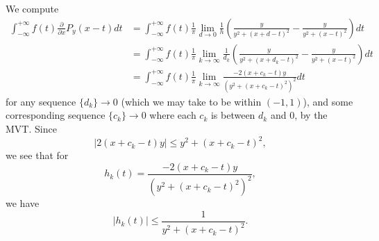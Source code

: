 \documentclass{article}
\newcommand\abs[1]{\left|#1\right|}
\begin{document}
We compute 
\begin{align*}
	\int_{-\infty}^{+\infty} f(t) \frac{\partial}{\partial x} P_{y}(x - t) dt &= \int_{-\infty}^{+\infty} f(t) \frac{1}{\pi} \lim_{d \rightarrow 0} \frac{1}{h} \left( \frac{y}{y^{2} + (x + d - t)^{2}} - \frac{y}{y^{2} + (x - t)^{2}} \right) dt \\
	&= \int_{-\infty}^{+\infty} f(t) \frac{1}{\pi} \lim_{k \rightarrow \infty} \frac{1}{d_{k}} \left( \frac{y}{y^{2} + (x + d_{k} - t)^{2}} - \frac{y}{y^{2} + (x - t)^{2}} \right) dt \\
	&= \int_{-\infty}^{+\infty} f(t) \frac{1}{\pi} \lim_{k \rightarrow \infty} \frac{-2(x + c_{k} - t)y}{(y^{2} + (x + c_{k} - t)^{2})^{2}} dt
\end{align*}
for any sequence $\{d_{k}\} \rightarrow 0$ (which we may take to be within $(-1, 1)$), and some corresponding sequence $\{c_{k}\} \rightarrow 0$ where each $c_{k}$ is between $d_{k}$ and $0$, by the MVT. Since 
\begin{equation*}
	\abs{2(x + c_{k} - t)y} \leq y^{2} + (x + c_{k} - t)^{2}, 
\end{equation*}
we see that for
\begin{equation*}
	h_{k}(t) = \frac{-2(x + c_{k} - t)y}{(y^{2} + (x + c_{k} - t)^{2})^{2}}, 
\end{equation*}
we have 
\begin{equation*}
	\abs{h_{k}(t)} \leq \frac{1}{y^{2} + (x + c_{k} - t)^{2}}.
\end{equation*}
\end{document}

